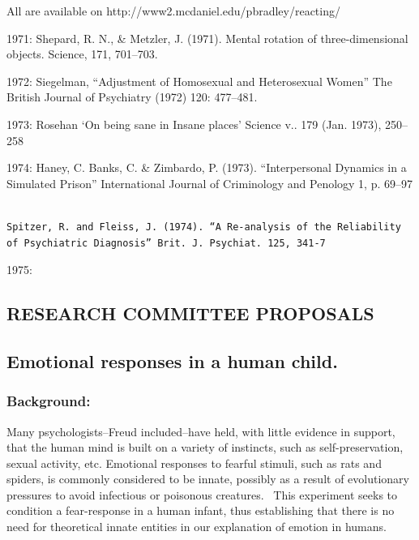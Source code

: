 All are available on http:\slash \slash www2.mcdaniel.edu\slash pbradley\slash reacting\slash  

1971: Shepard, R. N., \& Metzler, J. (1971). Mental rotation of three-dimensional objects. Science, 171, 701--703.

1972: Siegelman, “Adjustment of Homosexual and Heterosexual Women” The British Journal of Psychiatry (1972) 120: 477--481.

1973: Rosehan `On being sane in Insane places' Science v.. 179 (Jan. 1973), 250--258

1974: Haney, C. Banks, C. \& Zimbardo, P. (1973). “Interpersonal Dynamics in a Simulated Prison” International Journal of Criminology and Penology 1, p. 69--97 

\begin{adjustwidth}{2.5em}{2.5em}
\begin{verbatim}

Spitzer, R. and Fleiss, J. (1974). “A Re-analysis of the Reliability of Psychiatric Diagnosis” Brit. J. Psychiat. 125, 341-7

\end{verbatim}
\end{adjustwidth}

1975:

\pagebreak 

\subsection{RESEARCH COMMITTEE PROPOSALS}
\label{researchcommitteeproposals}

\subsection{Emotional responses in a human child.}
\label{emotionalresponsesinahumanchild.}

\subsubsection{Background:}
\label{background:}

Many psychologists--Freud included--have held, with little evidence in support, that the human mind is built on a variety of instincts, such as self-preservation, sexual activity, etc. Emotional responses to fearful stimuli, such as rats and spiders, is commonly considered to be innate, possibly as a result of evolutionary pressures to avoid infectious or poisonous creatures.  This experiment seeks to condition a fear-response in a human infant, thus establishing that there is no need for theoretical innate entities in our explanation of emotion in humans.

